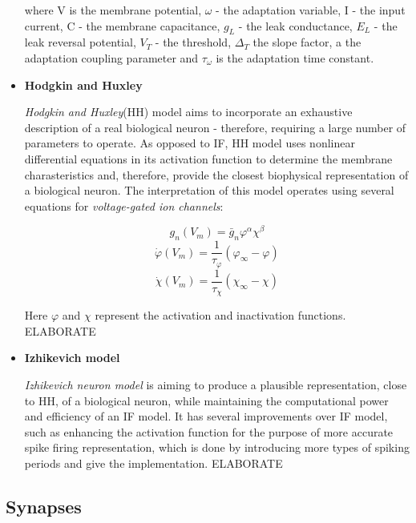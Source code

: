 \begin{itemize}
where V is the membrane potential, $\omega$ - the adaptation variable, I - the input current, C - the membrane capacitance, $g_{L}$ - the leak conductance, $E_{L}$ - the leak reversal potential, $V_{T}$ - the threshold, $\Delta_{T}$ the slope factor, a the adaptation coupling parameter and $\tau_{\omega}$ is the adaptation time constant.

\item \textbf{Hodgkin and Huxley}

\emph{Hodgkin and Huxley}(HH) model aims to incorporate an exhaustive description of a real biological neuron - therefore, requiring a large number of parameters to operate.
As opposed to IF, HH model uses nonlinear differential equations in its activation function to determine the membrane charasteristics and, therefore, provide the closest 
biophysical representation of a biological neuron.\cite{Hodgkin1952} The interpretation of this model operates using several equations for \emph{voltage-gated ion channels}:

\begin{center}
\begin{equation}g_{n}(V_{m}) = \bar{g}_{n} \varphi^{\alpha} \chi^{\beta}\end{equation}
\begin{equation}\dot{\varphi}(V_{m}) = \frac{1}{\tau_{\varphi}}(\varphi_{\infty} - \varphi)\end{equation}
\begin{equation}\dot{\chi}(V_{m}) = \frac{1}{\tau_{\chi}}(\chi_{\infty} - \chi)\end{equation}
\end{center}

Here $\varphi$ and $\chi$ represent the activation and inactivation functions.
ELABORATE

\item \textbf{Izhikevich model}

\emph{Izhikevich neuron model} is aiming to produce a plausible representation, close to HH, of a biological neuron, while maintaining the computational power and efficiency of an IF model.
It has several improvements over IF model, such as enhancing the activation function for the purpose of more accurate spike firing representation, which is done by introducing more 
types of spiking periods and give the implementation.\cite{Izhikevich2003}
ELABORATE

\end{itemize}

\subsection{Synapses}

